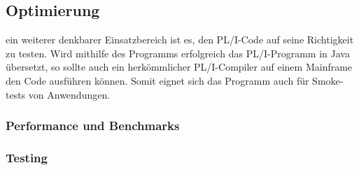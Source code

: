 	\subsection{Optimierung}
	ein weiterer denkbarer Einsatzbereich ist es, den PL/I-Code auf seine Richtigkeit zu testen. Wird mithilfe des Programms erfolgreich das PL/I-Programm in Java übersetzt, so sollte auch ein herkömmlicher PL/I-Compiler auf einem Mainframe den Code ausführen können. Somit eignet sich das Programm auch für Smoke-tests von Anwendungen.
		\subsubsection{Performance und Benchmarks}
		\subsubsection{Testing}
